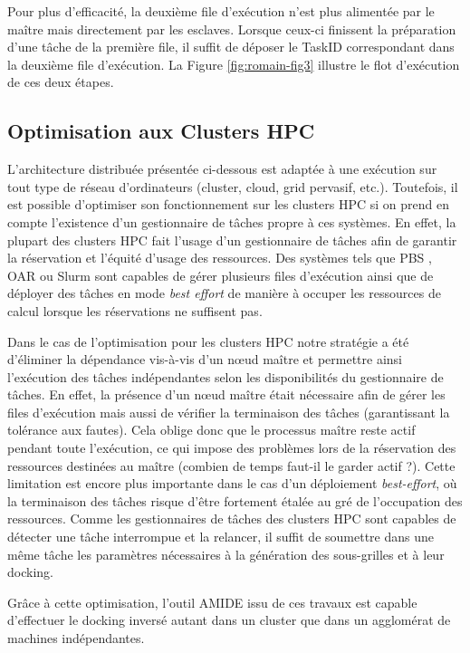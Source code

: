 Pour plus d'efficacité, la deuxième file d'exécution n'est plus alimentée par le maître mais directement par les esclaves. Lorsque ceux-ci finissent la préparation d'une tâche de la première file, il suffit de déposer le TaskID correspondant dans la deuxième file d'exécution. La Figure \ref{fig:romain-fig3} illustre le flot d'exécution de ces deux étapes.  


\subsection{Optimisation aux Clusters HPC}

 L'architecture distribuée présentée ci-dessous est adaptée à une exécution sur tout type de réseau d'ordinateurs (cluster, cloud, grid pervasif, etc.). Toutefois, il est possible d'optimiser son fonctionnement sur les clusters HPC si on prend en compte l'existence d'un gestionnaire de tâches propre à ces systèmes. En effet, la plupart des clusters HPC fait l'usage d'un gestionnaire de tâches afin de garantir la réservation et l'équité d'usage des ressources. Des systèmes tels que PBS \cite{Henderson95}, OAR \cite{Capit2005} ou Slurm \cite{Yoo2003} sont capables de gérer plusieurs files d'exécution ainsi que de déployer des tâches en mode \textit{best effort} de manière à occuper les ressources de calcul lorsque les réservations ne suffisent pas. 
 
 Dans le cas de l'optimisation pour les clusters HPC notre stratégie a été d'éliminer la dépendance vis-à-vis d'un n{\oe}ud maître et permettre ainsi l'exécution des tâches indépendantes selon les disponibilités du gestionnaire de tâches. En effet, la présence d'un n{\oe}ud maître était nécessaire afin de gérer les files d'exécution mais aussi de vérifier la terminaison des tâches (garantissant la tolérance aux fautes). Cela oblige donc que le processus maître reste actif pendant toute l'exécution, ce qui impose des problèmes lors de la réservation des ressources destinées au maître (combien de temps faut-il le garder actif ?). Cette limitation est encore plus importante dans le cas d'un déploiement \textit{best-effort}, où la terminaison des tâches risque d'être fortement étalée au gré de l'occupation des ressources. Comme les gestionnaires de tâches des clusters HPC sont capables de détecter une tâche interrompue et la relancer, il suffit de soumettre dans une même tâche les paramètres nécessaires à la génération des sous-grilles et à leur docking. 
 
 Grâce à cette optimisation, l'outil AMIDE issu de ces travaux est capable d'effectuer le docking inversé autant dans un cluster que dans un agglomérat de machines indépendantes.
 
